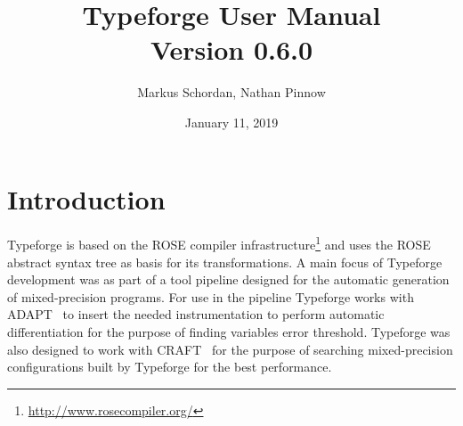 \documentclass[natbib]{article}
\begin{document}
\title{Typeforge User Manual\\Version 0.6.0}

\author{\small Markus Schordan, Nathan Pinnow}
\date{January 11, 2019}

\maketitle

%

\tableofcontents


\section{Introduction}
\label{sec:intro}

Typeforge is based on the ROSE compiler infrastructure\footnote{\url{http://www.rosecompiler.org/}} 
and uses the ROSE abstract syntax tree as basis for its transformations. 
A main focus of Typeforge development was as part of a tool pipeline designed for 
the automatic generation of mixed-precision programs. For use in the pipeline 
Typeforge works with ADAPT~\cite{adapt} to insert the needed instrumentation to 
perform automatic differentiation for the purpose of finding variables error threshold.
Typeforge was also designed to work with CRAFT~\cite{CRAFT2013PARCO,CRAFT2013ICS,CRAFT2016} 
for the purpose of searching mixed-precision configurations built by Typeforge 
for the best performance.
\end{document}
